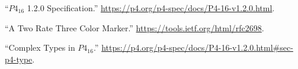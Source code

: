 \documentclass[11pt]{article}
\begin{document}
{%
{%
\begin{thebibliography}{39}%
\label{sec-bibliography}%

\mdbibitemlabel{{}[1]}\textquotedblleft{}$P4_{16}$ 1.2.0 Specification.\textquotedblright{} \href{https://p4.org/p4-spec/docs/P4-16-v1.2.0.html}{{\ttfamily https://\hspace{0pt}p4.\hspace{0pt}org/\hspace{0pt}p4-\hspace{0pt}spec/\hspace{0pt}docs/\hspace{0pt}P4-\hspace{0pt}16-\hspace{0pt}v1.\hspace{0pt}2.\hspace{0pt}0.\hspace{0pt}html}}.\label{p4spec}%

\mdbibitemlabel{{}[2]}\textquotedblleft{}A Two Rate Three Color Marker.\textquotedblright{} \href{https://tools.ietf.org/html/rfc2698}{{\ttfamily https://\hspace{0pt}tools.\hspace{0pt}ietf.\hspace{0pt}org/\hspace{0pt}html/\hspace{0pt}rfc2698}}.\label{rfc2698}%

\mdbibitemlabel{{}[3]}\textquotedblleft{}Complex Types in $P4_{16}$.\textquotedblright{} \href{https://p4.org/p4-spec/docs/P4-16-v1.2.0.html\%23sec-p4-type}{{\ttfamily https://\hspace{0pt}p4.\hspace{0pt}org/\hspace{0pt}p4-\hspace{0pt}spec/\hspace{0pt}docs/\hspace{0pt}P4-\hspace{0pt}16-\hspace{0pt}v1.\hspace{0pt}2.\hspace{0pt}0.\hspace{0pt}html\#\hspace{0pt}sec-\hspace{0pt}p4-\hspace{0pt}type}}.\label{p4complextypes}%


\end{thebibliography}}}
\end{document}
